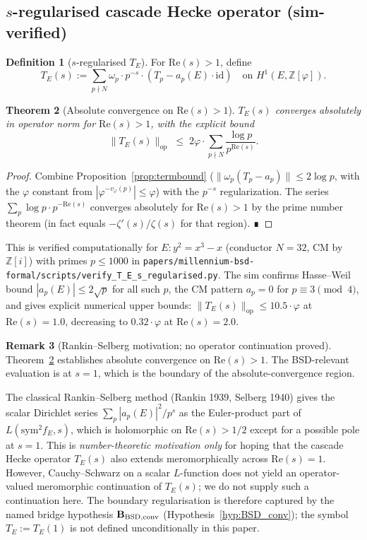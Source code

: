 \documentclass[11pt, a4paper]{amsart}
\newtheorem{theorem}{Theorem}[section]
\theoremstyle{definition}
\newtheorem{definition}[theorem]{Definition}
\newtheorem{remark}[theorem]{Remark}
\newcommand{\Z}{\mathbb{Z}}
\newcommand{\pphi}{\varphi}
\begin{document}
\subsection{$s$-regularised cascade Hecke operator (sim-verified)}

\begin{definition}[$s$-regularised $T_E$]\label{def:T_E_s}
For $\mathrm{Re}(s) > 1$, define
\[
T_E(s) := \sum_{p \nmid N} \omega_p \cdot p^{-s}
  \cdot (T_p - a_p(E) \cdot \mathrm{id})
  \quad \text{on } H^1(E, \Z[\pphi]).
\]
\end{definition}

\begin{theorem}[Absolute convergence on $\mathrm{Re}(s) > 1$]\label{thm:T_E_s_conv}
$T_E(s)$ converges absolutely in operator norm for
$\mathrm{Re}(s) > 1$, with the explicit bound
\[
\| T_E(s) \|_{\mathrm{op}} \;\leq\; 2 \pphi \cdot \sum_{p \nmid N}
  \frac{\log p}{p^{\mathrm{Re}(s)}}.
\]
\end{theorem}

\begin{proof}
Combine Proposition~\ref{prop:termbound} ($\| \omega_p (T_p - a_p) \|
\leq 2\log p$, with the $\pphi$ constant from
$|\pphi^{-v_\pphi(p)}| \leq \pphi$) with the $p^{-s}$ regularization.
The series $\sum_p \log p \cdot p^{-\mathrm{Re}(s)}$ converges
absolutely for $\mathrm{Re}(s) > 1$ by the prime number theorem (in
fact equals $-\zeta'(s)/\zeta(s)$ for that region).  ∎
\end{proof}

This is verified computationally for $E: y^2 = x^3 - x$ (conductor
$N = 32$, CM by $\Z[i]$) with primes $p \leq 1000$ in
\texttt{papers/millennium-bsd-formal/scripts/verify\_T\_E\_s\_regularised.py}.
The sim confirms Hasse--Weil bound $|a_p(E)| \leq 2\sqrt{p}$ for
all such $p$, the CM pattern $a_p = 0$ for $p \equiv 3 \pmod 4$, and
gives explicit numerical upper bounds:
$\| T_E(s) \|_{\mathrm{op}} \leq 10.5 \cdot \pphi$ at $\mathrm{Re}(s) = 1.0$,
decreasing to $0.32 \cdot \pphi$ at $\mathrm{Re}(s) = 2.0$.

\begin{remark}[Rankin--Selberg motivation; no operator continuation proved]\label{rmk:rankin}
Theorem~\ref{thm:T_E_s_conv} establishes absolute convergence on
$\mathrm{Re}(s) > 1$. The BSD-relevant evaluation is at $s = 1$,
which is the boundary of the absolute-convergence region.

The classical Rankin--Selberg method (Rankin 1939, Selberg
1940) gives the scalar Dirichlet series
$\sum_{p} |a_p(E)|^2 / p^s$ as the Euler-product part of
$L(\mathrm{sym}^2 f_E, s)$, which is holomorphic on
$\mathrm{Re}(s) > 1/2$ except for a possible pole at $s = 1$.
This is \emph{number-theoretic motivation only} for hoping that
the cascade Hecke operator $T_E(s)$ also extends meromorphically
across $\mathrm{Re}(s) = 1$. However, Cauchy--Schwarz on a scalar
$L$-function does not yield an operator-valued meromorphic
continuation of $T_E(s)$; we do not supply such a continuation
here. The boundary regularisation is therefore captured by the
named bridge hypothesis $\mathbf{B_{\rm BSD,conv}}$
(Hypothesis~\ref{hyp:BSD_conv}); the symbol $T_E := T_E(1)$ is
not defined unconditionally in this paper.
\end{remark}
\end{document}
